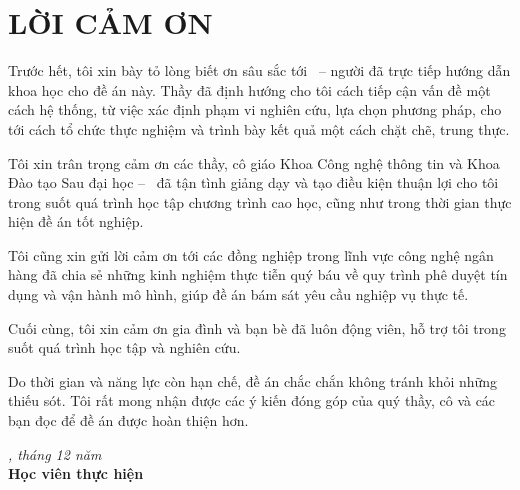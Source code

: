 \chapter*{LỜI CẢM ƠN}

Trước hết, tôi xin bày tỏ lòng biết ơn sâu sắc tới \thesisSupervisor\ -- người đã
trực tiếp hướng dẫn khoa học cho đề án này. Thầy đã định hướng cho tôi cách tiếp
cận vấn đề một cách hệ thống, từ việc xác định phạm vi nghiên cứu, lựa chọn
phương pháp, cho tới cách tổ chức thực nghiệm và trình bày kết quả một cách chặt
chẽ, trung thực.

Tôi xin trân trọng cảm ơn các thầy, cô giáo Khoa Công nghệ thông tin và Khoa Đào
tạo Sau đại học -- \thesisInstitution\ đã tận tình giảng dạy và tạo điều kiện
thuận lợi cho tôi trong suốt quá trình học tập chương trình cao học, cũng như
trong thời gian thực hiện đề án tốt nghiệp.

Tôi cũng xin gửi lời cảm ơn tới các đồng nghiệp trong lĩnh vực công nghệ ngân
hàng đã chia sẻ những kinh nghiệm thực tiễn quý báu về quy trình phê duyệt tín
dụng và vận hành mô hình, giúp đề án bám sát yêu cầu nghiệp vụ thực tế.

Cuối cùng, tôi xin cảm ơn gia đình và bạn bè đã luôn động viên, hỗ trợ tôi trong
suốt quá trình học tập và nghiên cứu.

Do thời gian và năng lực còn hạn chế, đề án chắc chắn không tránh khỏi những
thiếu sót. Tôi rất mong nhận được các ý kiến đóng góp của quý thầy, cô và các
bạn đọc để đề án được hoàn thiện hơn.

\vspace{0.9cm}

\hfill\begin{minipage}{0.45\textwidth}
\centering
\textit{\thesisCity, tháng 12 năm \thesisYear}\\[4pt]
\textbf{Học viên thực hiện}\\[2.2cm]
\textbf{\thesisAuthor}
\end{minipage}
